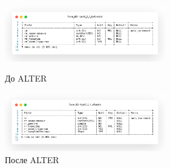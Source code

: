 \begin{figure}[!h]
  \centering

  \begin{minipage}{0.49\textwidth}
    \centering

    \includegraphics[width=7cm]
    {../sql/task5/task5_2_1_before.png}

    \caption{До ALTER}
    \label{fig:task5_2_1_before}
  \end{minipage}
  \begin{minipage}{0.49\textwidth}
    \centering

    \includegraphics[width=7cm]
    {../sql/task5/task5_2_1_after.png}

    \caption{После ALTER}
    \label{fig:task5_2_1_after}
  \end{minipage}
\end{figure}

